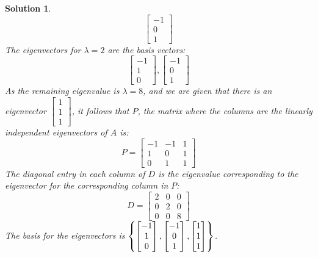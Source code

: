\documentclass[11pt]{scrartcl}
\theoremstyle{dotlessP}
\newtheorem{sol}{Solution}[section]
\theoremstyle{dotlessN}
\DeclarePairedDelimiter\set{\{}{\}}
\begin{document}
\begin{sol}
\[		\begin{bmatrix}
			-1 \\
			0 \\
			1
		\end{bmatrix}
	\] 
	The eigenvectors for $\lambda = 2$ are the basis vectors:
	\[
	\begin{bmatrix}
		-1 \\
		1 \\
		0
	\end{bmatrix}, 
	\begin{bmatrix}
		-1 \\
		0 \\
		1
	\end{bmatrix}
	\] 
	As the remaining eigenvalue is $\lambda = 8$, and we are given that there is an eigenvector $
	\begin{bmatrix}
		1 \\
		1 \\
		1
	\end{bmatrix}$, it follows that $P$, the matrix where the columns are the linearly independent eigenvectors of $A$ is:
	\[
	P = 
	\begin{bmatrix}
		-1 & -1 & 1 \\
		1 & 0 & 1 \\
		0 & 1 & 1
	\end{bmatrix}
	\] 
	The diagonal entry in each column of $D$ is the eigenvalue corresponding to the eigenvector for the corresponding column in $P$:
	\[
	D = 
	\begin{bmatrix}
		2 & 0 & 0 \\
		0 & 2 & 0 \\
		0 & 0 & 8
	\end{bmatrix}
	\] 
	The basis for the eigenvectors is $\set*{
\begin{bmatrix}
	-1 \\
	1 \\
	0
\end{bmatrix},
\begin{bmatrix}
	-1 \\
	0 \\
	1
\end{bmatrix},
\begin{bmatrix}
	1 \\
	1 \\
	1
\end{bmatrix}
	}$.
\end{sol}
\end{document}
